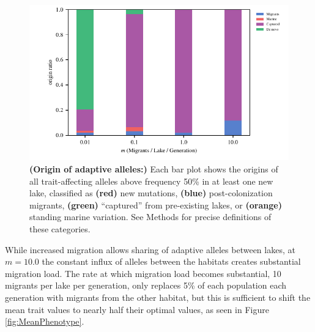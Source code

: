 \documentclass{article}
\newcommand{\plr}[1]{\todo[linecolor=blue,backgroundcolor=blue!25,bordercolor=blue]{#1}}
\begin{document}
\begin{figure}
	\begin{center}
  		\includegraphics[width=0.7\linewidth]{Final_Plots/Allele_Origin_2.pdf}
  		\caption{ 
        		\textbf{(Origin of adaptive alleles:)}
        		Each bar plot shows the origins
		of all trait-affecting alleles above frequency 50\% in at least one new lake,
        		classified as
		\textbf{(red)} new mutations,
		\textbf{(blue)} post-colonization migrants,
		\textbf{(green)} ``captured'' from pre-existing lakes, or
		\textbf{(orange)} standing marine variation.
        		See Methods for precise definitions of these categories.
		}
  		\label{fig:Origin}
	\end{center}
\end{figure}

While increased migration allows sharing of adaptive alleles between lakes, 
at $m = 10.0$ the constant influx of alleles between the habitats creates substantial migration load. 
The rate at which migration load becomes substantial,
10 migrants per lake per generation,
only replaces 5\% of each population each generation with migrants from the other habitat, 
but this is sufficient to shift the mean trait values to nearly half their optimal values, 
as seen in Figure \ref{fig:MeanPhenotype}. 

\end{document}
